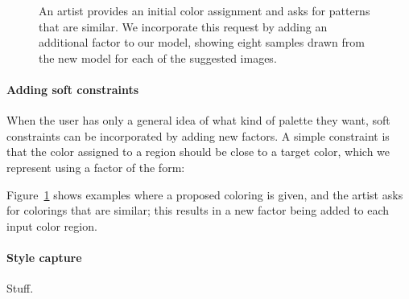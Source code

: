\begin{figure}[ht]
\caption{An artist provides an initial color assignment and asks for patterns that are similar. We incorporate this request by adding an additional factor to our model, showing eight samples drawn from the new model for each of the suggested images.}
\label{fig:nearbySuggestions}
\vspace{-1.0em}
\end{figure}

\paragraph{Adding soft constraints} When the user has only a general idea of what kind of palette they want, soft constraints can be incorporated by adding new factors. A simple constraint is that the color assigned to a region should be close to a target color, which we represent using a factor of the form:


Figure~\ref{fig:nearbySuggestions} shows examples where a proposed coloring is given, and the artist asks for colorings that are similar; this results in a new factor being added to each input color region. 

\paragraph{Style capture} Stuff.

